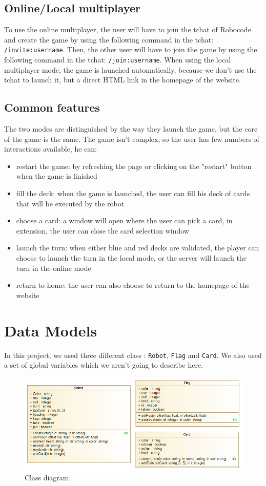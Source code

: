 \documentclass[a4paper, 10pt, oneside]{article}
\begin{document}
	\subsection{Online/Local multiplayer}
		To use the online multiplayer, the user will have to join the tchat of Robocode and create the game by using the following command in the tchat: \texttt{/invite:username}.
		Then, the other user will have to join the game by using the following command in the tchat: \texttt{/join:username}. When using the local multiplayer mode, the game is launched automatically, because we don't use the tchat to launch it, but a direct HTML link in the homepage of the website.
		
	\subsection{Common features}
		The two modes are distinguished by the way they launch the game, but the core of the game is the same. The game isn't complex, so the user has few numbers of interactions available, he can:
		\begin{itemize}
			\item restart the game: by refreshing the page or clicking on the "restart" button when the game is finished
			\item fill the deck: when the game is launched, the user can fill his deck of cards that will be executed by the robot
			\item choose a card: a window will open where the user can pick a card, in extension, the user can close the card selection window
			\item launch the turn: when either blue and red decks are validated, the player can choose to launch the turn in the local mode, or the server will launch the turn in the online mode
			\item return to home: the user can also choose to return to the homepage of the website
		\end{itemize}

\newpage
\section{Data Models}
	In this project, we used three different class : \texttt{Robot}, \texttt{Flag} and \texttt{Card}. We also used a set of global variables which we aren't going to describe here.

	\begin{figure}[h]
		\centering
		\includegraphics[scale=0.5]{img/class.png}
		\caption{Class diagram}
		\label{fig:Class}
	\end{figure}
	
\end{document}
